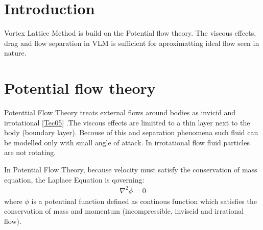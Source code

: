 \documentclass[letterpaper,10pt,english]{jupyterBook}
\begin{document}
\section{Introduction}
\label{\detokenize{chapters/description/theory:introduction}}
\sphinxAtStartPar
Vortex Lattice Method is build on the Potential flow theory. The viscous effects, drag and flow separation in VLM is sufficient for aproximatting ideal flow seen in nature.


\section{Potential flow theory}
\label{\detokenize{chapters/description/theory:potential-flow-theory}}
\sphinxAtStartPar
Potenttial Flow Theory treats external flows around bodies as invicid and irrotational {[}\hyperlink{cite.chapters/bibliography:id5}{Tec05}{]} .The viscous effects are limitted to a thin layer next to the body (boundary layer). Becouse of this and separation phenomena such fluid can be modelled only with small angle of attack. In irrotational flow fluid particles are not rotating.

\sphinxAtStartPar
In Potential Flow Theory, because velocity must satisfy the conservation of mass equation, the Laplace Equation is qoverning:
\begin{equation*}
\begin{split}
\nabla^{2} \phi = 0
\end{split}
\end{equation*}
\sphinxAtStartPar
where \(\phi\) is a potentinal function defined as continous function which satisfies the conservation of mass and momentum (incompressible, inviscid and irrational flow).
\end{document}

